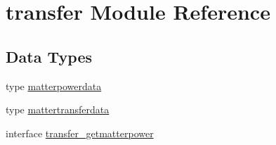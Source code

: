 \hypertarget{namespacetransfer}{}\section{transfer Module Reference}
\label{namespacetransfer}
\subsection*{Data Types}
\begin{DoxyCompactItemize}
\item 
type \mbox{\hyperlink{structtransfer_1_1matterpowerdata}{matterpowerdata}}
\item 
type \mbox{\hyperlink{structtransfer_1_1mattertransferdata}{mattertransferdata}}
\item 
interface \mbox{\hyperlink{interfacetransfer_1_1transfer__getmatterpower}{transfer\+\_\+getmatterpower}}
\end{DoxyCompactItemize}
